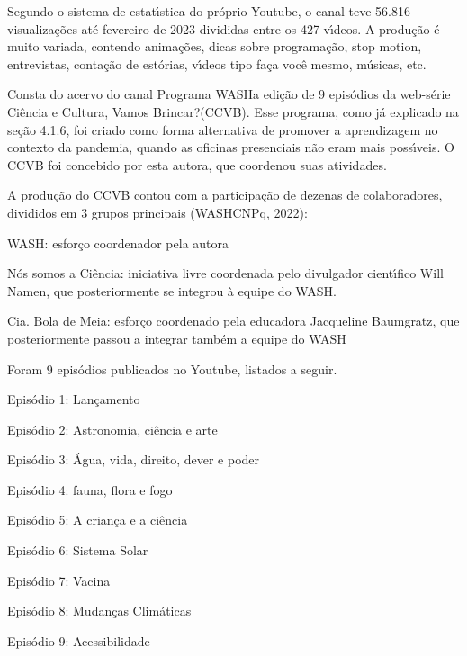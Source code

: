 \documentclass[
12pt,		%
openright,	%
twoside,  %
a4paper,			%
chapter=TITLE,		%
english,			%
french,				%
spanish,			%
brazil				%
]{USPSC-classe/USPSC}
\begin{document}
Segundo o sistema de estat\'{\i}stica do pr\'oprio Youtube, o canal teve 56.816 visualiza\c{c}\~oes at\'e fevereiro de 2023 divididas entre os 427 v\'{\i}deos. A produ\c{c}\~ao \'e muito variada, contendo anima\c{c}\~oes, dicas sobre programa\c{c}\~ao, \textquotedbl stop motion\textquotedbl , entrevistas, conta\c{c}\~ao de est\'orias, v\'{\i}deos tipo \textquotedbl fa\c{c}a voc\^e mesmo\textquotedbl , m\'usicas, etc.








Consta do acervo do canal \textquotedbl Programa WASH\textquotedbl  a edi\c{c}\~ao de 9 epis\'odios da web-s\'erie \textquotedbl Ci\^encia e Cultura, Vamos Brincar?\textquotedbl  (CCVB). Esse programa, como j\'a explicado na se\c{c}\~ao 4.1.6, foi criado como forma alternativa de promover a aprendizagem no contexto da pandemia, quando as oficinas presenciais n\~ao eram mais poss\'{\i}veis. O CCVB foi concebido por esta autora, que coordenou suas atividades.








A produ\c{c}\~ao do CCVB contou com a participa\c{c}\~ao de dezenas de colaboradores, divididos em 3 grupos principais  (WASHCNPq, 2022):









\begin{alineas}
\item WASH: esfor\c{c}o coordenador pela autora
\item \textquotedbl N\'os somos a Ci\^encia\textquotedbl : iniciativa livre coordenada pelo divulgador cient\'{\i}fico Will Namen, que posteriormente se integrou \`a equipe do WASH.
\item Cia. Bola de Meia: esfor\c{c}o coordenado pela educadora Jacqueline Baumgratz, que posteriormente passou a integrar tamb\'em a equipe do WASH
\end{alineas}

Foram 9 epis\'odios publicados no Youtube, listados a seguir.









\begin{alineas}
\item Epis\'odio 1: Lan\c{c}amento
\item Epis\'odio 2: Astronomia, ci\^encia e arte
\item Epis\'odio 3: \'Agua, vida, direito, dever e poder
\item Epis\'odio 4: fauna, flora e fogo
\item Epis\'odio 5: A crian\c{c}a e a ci\^encia
\item Epis\'odio 6: Sistema Solar
\item Epis\'odio 7: Vacina
\item Epis\'odio 8: Mudan\c{c}as Clim\'aticas
\item Epis\'odio 9: Acessibilidade
\end{alineas}
\end{document}
